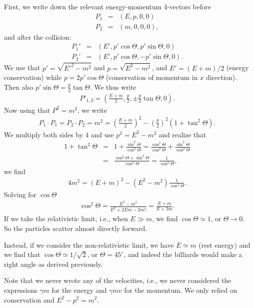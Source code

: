 \documentclass[12pt]{article}
\newcommand{\be}{\begin{eqnarray}}
\newcommand{\ee}{\end{eqnarray}}
\begin{document}
First, we write down the relevant energy-momentum 4-vectors before 
\be
P_1 &=& (E,p,0,0)\\
P_2 &=& (m,0,0,0),
\ee
and after the collision:
\be
P_1' &=& (E',p'\cos\Theta, p'\sin \Theta,0)\\
P_2' &=& (E',p'\cos\Theta, -p'\sin \Theta, 0 ). 
\ee
We use that $p'=\sqrt{E'^2-m^2}$ and $p = \sqrt{E^2-m^2}$, and $E' = (E+m)/2$ (energy conservation) while $p = 2p'\cos \Theta$ (conservation of momentum in $x$ direction). Then also $p' \sin \Theta  = \frac{p}{2} \tan \Theta $. We thus write
\be
P'_{1,2} = \left( \frac{E+m}{2}, \frac{p}{2}, \pm \frac{p}{2}\tan \Theta, 0\right).
\ee
Now using that $P^2 = m^2$, we write
\be
P_1 \cdot P_1 =P_2 \cdot P_2= m^2 = \left(\frac{E+m}{2}\right)^2 -\left(\frac{p}{2}\right)^2 (1 + \tan^2 \Theta).
\ee
We multiply both sides by $4$ and use $p^2 = E^2 - m^2$ and realize that 
\be 1+ \tan^2 \Theta &=& 1 + \frac{\sin^2 \Theta}{ \cos^2 \Theta} 
= \frac{\cos^2 \Theta}{\cos^2 \Theta} + \frac{\sin^2 \Theta}{ \cos^2 \Theta} \nonumber  \\ &=& \frac{\cos^2 \Theta + \sin^2 \Theta}{\cos^2\Theta}= \frac{1}{\cos^2\Theta},
\ee
we find
\be
4 m^2 = (E+m)^2 -(E^2 - m^2)\frac{1}{\cos^2 \Theta}. 
\ee
Solving for $\cos \Theta$
\be
\cos^2 \Theta = \frac{E^2 -m^2}{E^2+2Em-3m^2} = \frac{E+m}{E+3m}. 
\ee
If we take the relativistic limit, i.e., when $E\gg m$, we find $\cos \Theta \simeq 1$, or $\Theta\rightarrow 0$. So the particles scatter almost directly forward. 

Instead, if we consider the non-relativistic limit, we have $E\simeq m$ (rest energy) and we find that $\cos \Theta \simeq 1/\sqrt{2}$, or $\Theta  = 45^\circ$, and indeed the billiards would make a right angle as derived previously. 

Note that we never wrote any of the velocities, i.e., we never considered the expressions $\gamma m$ for the energy and $\gamma m v$ for the momentum. We only relied on conservation and $E^2 - p^2 = m^2$. 
\end{document}
